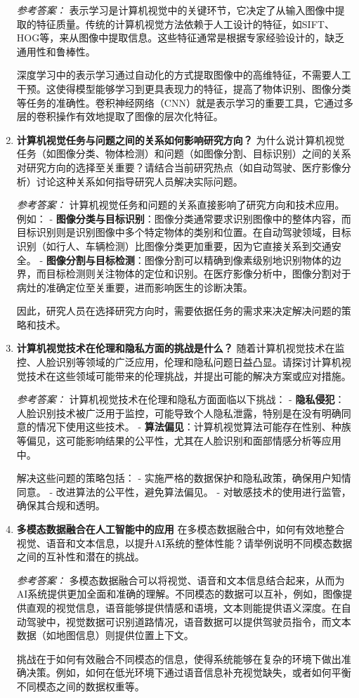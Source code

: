 \begin{enumerate}
    
    \textit{参考答案：}  
    表示学习是计算机视觉中的关键环节，它决定了从输入图像中提取的特征质量。传统的计算机视觉方法依赖于人工设计的特征，如SIFT、HOG等，来从图像中提取信息。这些特征通常是根据专家经验设计的，缺乏通用性和鲁棒性。
    
    深度学习中的表示学习通过自动化的方式提取图像中的高维特征，不需要人工干预。这使得模型能够学习到更具表现力的特征，提高了物体识别、图像分类等任务的准确性。卷积神经网络（CNN）就是表示学习的重要工具，它通过多层的卷积操作有效地提取了图像的层次化特征。

    \item \textbf{计算机视觉任务与问题之间的关系如何影响研究方向？}  
    为什么说计算机视觉任务（如图像分类、物体检测）和问题（如图像分割、目标识别）之间的关系对研究方向的选择至关重要？请结合当前研究热点（如自动驾驶、医疗影像分析）讨论这种关系如何指导研究人员解决实际问题。


    \textit{参考答案：}  
    计算机视觉任务和问题的关系直接影响了研究方向和技术应用。例如：
    - \textbf{图像分类与目标识别}：图像分类通常要求识别图像中的整体内容，而目标识别则是识别图像中多个特定物体的类别和位置。在自动驾驶领域，目标识别（如行人、车辆检测）比图像分类更加重要，因为它直接关系到交通安全。
    - \textbf{图像分割与目标检测}：图像分割可以精确到像素级别地识别物体的边界，而目标检测则关注物体的定位和识别。在医疗影像分析中，图像分割对于病灶的准确定位至关重要，进而影响医生的诊断决策。

    因此，研究人员在选择研究方向时，需要依据任务的需求来决定解决问题的策略和技术。

    \item \textbf{计算机视觉技术在伦理和隐私方面的挑战是什么？}  
    随着计算机视觉技术在监控、人脸识别等领域的广泛应用，伦理和隐私问题日益凸显。请探讨计算机视觉技术在这些领域可能带来的伦理挑战，并提出可能的解决方案或应对措施。

    
    \textit{参考答案：}  
    计算机视觉技术在伦理和隐私方面面临以下挑战：
    - \textbf{隐私侵犯}：人脸识别技术被广泛用于监控，可能导致个人隐私泄露，特别是在没有明确同意的情况下使用这些技术。
    - \textbf{算法偏见}：计算机视觉算法可能存在性别、种族等偏见，这可能影响结果的公平性，尤其在人脸识别和面部情感分析等应用中。

    解决这些问题的策略包括：
    - 实施严格的数据保护和隐私政策，确保用户知情同意。
    - 改进算法的公平性，避免算法偏见。
    - 对敏感技术的使用进行监管，确保其合规和透明。
    
    \item \textbf{多模态数据融合在人工智能中的应用}  
    在多模态数据融合中，如何有效地整合视觉、语音和文本信息，以提升AI系统的整体性能？请举例说明不同模态数据之间的互补性和潜在的挑战。

    \textit{参考答案：}  
    多模态数据融合可以将视觉、语音和文本信息结合起来，从而为AI系统提供更加全面和准确的理解。不同模态的数据可以互补，例如，图像提供直观的视觉信息，语音能够提供情感和语境，文本则能提供语义深度。在自动驾驶中，视觉数据可识别道路情况，语音数据可以提供驾驶员指令，而文本数据（如地图信息）则提供位置上下文。

    挑战在于如何有效融合不同模态的信息，使得系统能够在复杂的环境下做出准确决策。例如，如何在低光环境下通过语音信息补充视觉缺失，或者如何平衡不同模态之间的数据权重等。

\end{enumerate}
